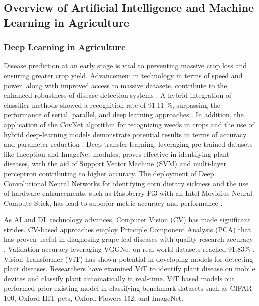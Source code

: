 \subsection{Overview of Artificial Intelligence and Machine Learning  in Agriculture}

\subsubsection{Deep Learning in Agriculture}
\sectionTitleBody
Disease prediction at an early stage is vital to preventing
	massive crop loss and ensuring greater crop yield. Advancement in
	technology in terms of speed and power, along with improved access
	to massive datasets, contribute to the enhanced robustness of disease
	detection systems \citep{wuDetectionEnumerationWheat2020a}. A hybrid integration of classifier
	methods showed a recognition rate of 91.11 \%, surpassing the performance
	of serial, parallel, and deep learning approaches \citep{elmassiCombinationMultipleClassifiers2021a}.
	In addition, the application of the CovNet algorithm for recognizing
	weeds in crops and the use of hybrid deep-learning models demonstrate
	potential results in terms of accuracy and parameter reduction \citep{zhouTomatoLeafDisease2021a}. Deep transfer learning, leveraging pre-trained datasets
	like Inception and ImageNet modules, proves effective in identifying
	plant diseases, with the aid of Support Vector Machine (SVM) and multi-layer
	perceptron contributing to higher accuracy. The deployment of Deep
	Convolutional Neural Networks for identifying corn dietary sickness
	and the use of hardware enhancements, such as Raspberry Pi3 with an
	Intel Movidius Neural Compute Stick, has lead to superior metric accuracy
	and performance \citep{sunNorthernMaizeLeaf2020a}.

As AI and DL technology advances, Computer Vision (CV) has
	made significant strides. CV-based approaches employ Principle Component
	Analysis (PCA) that has proven useful in diagnosing grape leaf diseases
	with quality research accuracy \citep{xieDeepLearningBasedRealTimeDetector2020a}. Validation accuracy
	leveraging VGGNet on real-world datasets reached 91.83\% \citep{xieDeepLearningBasedRealTimeDetector2020a}. Vision Transformer (ViT) has shown potential in developing
	models for detecting plant diseases. Researchers have examined ViT
	to identify plant disease on mobile devices and classify plant automatically
	in real-time. ViT based models out performed prior existing model
	in classifying benchmark datasets such as CIFAR-100, Oxford-IIIT pets,
	Oxford Flowers-102, and ImageNet.

